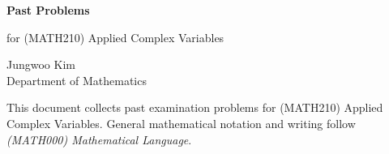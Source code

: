 \documentclass[11pt,oneside]{article}
\begin{document}
\thispagestyle{empty}

\begin{center}
    \vspace*{1.1cm}

    {\LARGE\bfseries Past Problems\par}

    \vspace{0.25cm}

    {\large for (MATH210) Applied Complex Variables\par}

    \vspace{0.75cm}

    {\normalsize
    Jungwoo Kim\\
    Department of Mathematics\\
    \PohangUniversityOfScienceAndTechnology
    \par}
\end{center}

\vspace{0.45cm}

This document collects past examination problems for (MATH210) Applied Complex Variables. General mathematical notation and writing follow \textit{(MATH000) Mathematical Language}.
\end{document}
